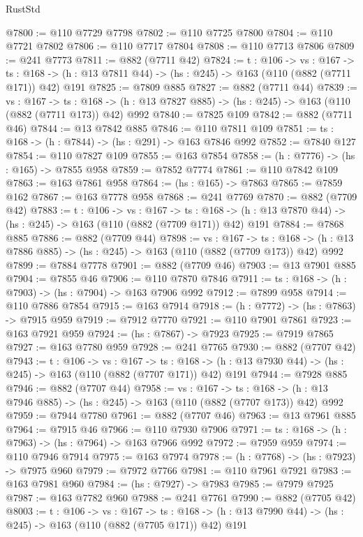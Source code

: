 \begin{lexlean}{RustStd}
\begin{coremodule}
@7800 := @110 @7729 @7798
@7802 := @110 @7725 @7800
@7804 := @110 @7721 @7802
@7806 := @110 @7717 @7804
@7808 := @110 @7713 @7806
@7809 := @241 @7773
@7811 := @882 (@7711 @42)
@7824 := {t : @106} ->
  {vs : @167} ->
  {ts : @168} -> (h : @13 @7811 @44) -> (hs : @245) -> @163 (@110 (@882 (@7711 @171)) @42) @191
@7825 := @7809 @885
@7827 := @882 (@7711 @44)
@7839 := {vs : @167} ->
  {ts : @168} -> (h : @13 @7827 @885) -> (hs : @245) -> @163 (@110 (@882 (@7711 @173)) @42) @992
@7840 := @7825 @109
@7842 := @882 (@7711 @46)
@7844 := @13 @7842 @885
@7846 := @110 @7811 @109
@7851 := {ts : @168} -> (h : @7844) -> (hs : @291) -> @163 @7846 @992
@7852 := @7840 @127
@7854 := @110 @7827 @109
@7855 := @163 @7854
@7858 := (h : @7776) -> (hs : @165) -> @7855 @958
@7859 := @7852 @7774
@7861 := @110 @7842 @109
@7863 := @163 @7861 @958
@7864 := (hs : @165) -> @7863
@7865 := @7859 @162
@7867 := @163 @7778 @958
@7868 := @241 @7769
@7870 := @882 (@7709 @42)
@7883 := {t : @106} ->
  {vs : @167} ->
  {ts : @168} -> (h : @13 @7870 @44) -> (hs : @245) -> @163 (@110 (@882 (@7709 @171)) @42) @191
@7884 := @7868 @885
@7886 := @882 (@7709 @44)
@7898 := {vs : @167} ->
  {ts : @168} -> (h : @13 @7886 @885) -> (hs : @245) -> @163 (@110 (@882 (@7709 @173)) @42) @992
@7899 := @7884 @7778
@7901 := @882 (@7709 @46)
@7903 := @13 @7901 @885
@7904 := @7855 @46
@7906 := @110 @7870 @7846
@7911 := {ts : @168} -> (h : @7903) -> (hs : @7904) -> @163 @7906 @992
@7912 := @7899 @958
@7914 := @110 @7886 @7854
@7915 := @163 @7914
@7918 := (h : @7772) -> (hs : @7863) -> @7915 @959
@7919 := @7912 @7770
@7921 := @110 @7901 @7861
@7923 := @163 @7921 @959
@7924 := (hs : @7867) -> @7923
@7925 := @7919 @7865
@7927 := @163 @7780 @959
@7928 := @241 @7765
@7930 := @882 (@7707 @42)
@7943 := {t : @106} ->
  {vs : @167} ->
  {ts : @168} -> (h : @13 @7930 @44) -> (hs : @245) -> @163 (@110 (@882 (@7707 @171)) @42) @191
@7944 := @7928 @885
@7946 := @882 (@7707 @44)
@7958 := {vs : @167} ->
  {ts : @168} -> (h : @13 @7946 @885) -> (hs : @245) -> @163 (@110 (@882 (@7707 @173)) @42) @992
@7959 := @7944 @7780
@7961 := @882 (@7707 @46)
@7963 := @13 @7961 @885
@7964 := @7915 @46
@7966 := @110 @7930 @7906
@7971 := {ts : @168} -> (h : @7963) -> (hs : @7964) -> @163 @7966 @992
@7972 := @7959 @959
@7974 := @110 @7946 @7914
@7975 := @163 @7974
@7978 := (h : @7768) -> (hs : @7923) -> @7975 @960
@7979 := @7972 @7766
@7981 := @110 @7961 @7921
@7983 := @163 @7981 @960
@7984 := (hs : @7927) -> @7983
@7985 := @7979 @7925
@7987 := @163 @7782 @960
@7988 := @241 @7761
@7990 := @882 (@7705 @42)
@8003 := {t : @106} ->
  {vs : @167} ->
  {ts : @168} -> (h : @13 @7990 @44) -> (hs : @245) -> @163 (@110 (@882 (@7705 @171)) @42) @191

\end{coremodule}
\end{lexlean}
